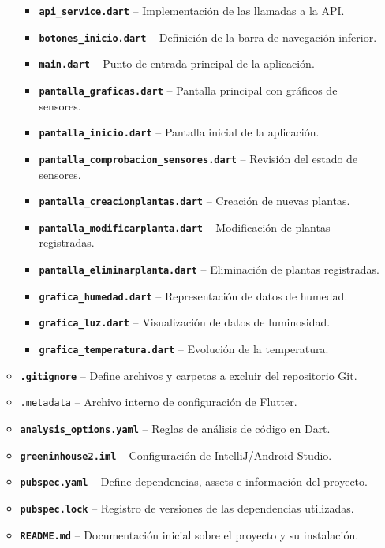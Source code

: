 \begin{itemize}
\begin{itemize}
\begin{itemize}
    \item \textbf{\texttt{api\_service.dart}} – Implementación de las llamadas a la API.
    \item \textbf{\texttt{botones\_inicio.dart}} – Definición de la barra de navegación inferior.
    \item \textbf{\texttt{main.dart}} – Punto de entrada principal de la aplicación.

    \item \texttt{\textbf{pantalla\_graficas.dart}} – Pantalla principal con gráficos de sensores.
    \item \texttt{\textbf{pantalla\_inicio.dart}} – Pantalla inicial de la aplicación.
    \item \texttt{\textbf{pantalla\_comprobacion\_sensores.dart}} – Revisión del estado de sensores.
    \item \texttt{\textbf{pantalla\_creacionplantas.dart}} – Creación de nuevas plantas.
    \item \texttt{\textbf{pantalla\_modificarplanta.dart}} – Modificación de plantas registradas.
    \item \texttt{\textbf{pantalla\_eliminarplanta.dart}} – Eliminación de plantas registradas.

    \item \texttt{\textbf{grafica\_humedad.dart}} – Representación de datos de humedad.
    \item \texttt{\textbf{grafica\_luz.dart}} – Visualización de datos de luminosidad.
    \item \texttt{\textbf{grafica\_temperatura.dart}} – Evolución de la temperatura.
    \end{itemize}

    \item \texttt{\textbf{.gitignore}} – Define archivos y carpetas a excluir del repositorio Git.
    \item \texttt{.metadata} – Archivo interno de configuración de Flutter.
    \item \texttt{\textbf{analysis\_options.yaml}} – Reglas de análisis de código en Dart.
    \item \texttt{\textbf{greeninhouse2.iml}} – Configuración de IntelliJ/Android Studio.
    \item \texttt{\textbf{pubspec.yaml}} – Define dependencias, assets e información del proyecto.
    \item \texttt{\textbf{pubspec.lock}} – Registro de versiones de las dependencias utilizadas.
    \item \texttt{\textbf{README.md}} – Documentación inicial sobre el proyecto y su instalación.
    \end{itemize}
\end{itemize}


